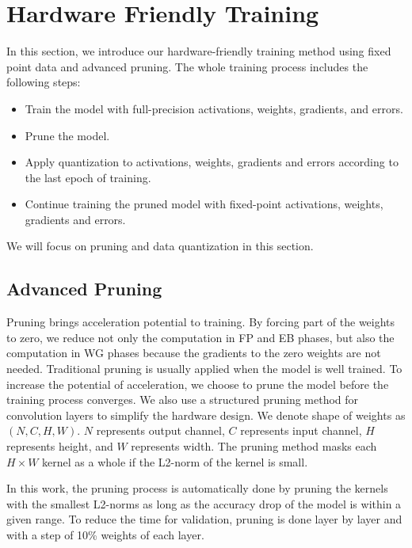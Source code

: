 \section{Hardware Friendly Training}\label{sec:training}
In this section, we introduce our hardware-friendly training method using fixed point data and advanced pruning. The whole training process includes the following steps:
\begin{itemize}
  \item Train the model with full-precision activations, weights, gradients, and errors.
  \item Prune the model. 
  \item Apply quantization to activations, weights, gradients and errors according to the last epoch of training.  
  \item Continue training the pruned model with fixed-point activations, weights, gradients and errors.
\end{itemize}
We will focus on pruning and data quantization in this section.

\subsection{Advanced Pruning}\label{sec:training:prune}

Pruning brings acceleration potential to training. By forcing part of the weights to zero, we reduce not only the computation in FP and EB phases, but also the computation in WG phases because the gradients to the zero weights are not needed. Traditional pruning is usually applied when the model is well trained. To increase the potential of acceleration, we choose to prune the model before the training process converges. We also use a structured pruning method for convolution layers to simplify the hardware design. We denote shape of weights as $(N, C, H, W)$. $N$ represents output channel, $C$ represents input channel, $H$ represents height, and $W$ represents width. The pruning method masks each $H\times W$ kernel as a whole if the L2-norm of the kernel is small. 

In this work, the pruning process is automatically done by pruning the kernels with the smallest L2-norms as long as the accuracy drop of the model is within a given range. To reduce the time for validation, pruning is done layer by layer and with a step of 10\% weights of each layer.

